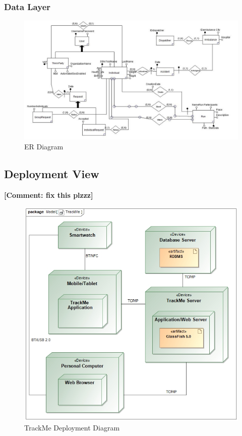 \documentclass[a4paper]{article}
\newcommand{\comment}[1]{\textbf{[Comment: #1]}}
\begin{document}
\newpage

\subsubsection{Data Layer}


\begin{figure}[!htpb]
    \centering
    \includegraphics[width=\textwidth,keepaspectratio]{DD/images/TM_ER.jpg}
    \caption{ER Diagram}
    \label{fig:ER_trackme}
\end{figure}

\newpage
\subsection{Deployment View}
\comment{fix this plzzz}
\begin{figure}
    \centering
    \includegraphics[width=\textwidth,keepaspectratio]{images/UML/deployment_TrackMe.jpg}
    \caption{TrackMe Deployment Diagram}
    \label{fig:deployment_trackme}
\end{figure}
\end{document}

